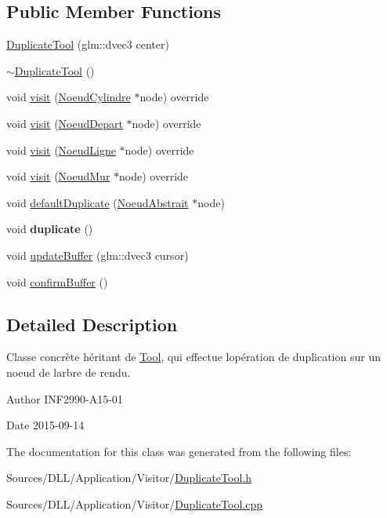 \subsection*{Public Member Functions}
\begin{DoxyCompactItemize}
\item 
\hyperlink{group__inf2990_ga13dd0524e005f4a44dbaeea9f237d761}{Duplicate\+Tool} (glm\+::dvec3 center)
\item 
\hyperlink{group__inf2990_gaab141bc62b424e5e0bfc48bd899bcb8a}{$\sim$\+Duplicate\+Tool} ()
\item 
void \hyperlink{group__inf2990_gab91de27487440694048c1a0fbcc74da7}{visit} (\hyperlink{class_noeud_cylindre}{Noeud\+Cylindre} $\ast$node) override
\item 
void \hyperlink{group__inf2990_ga5fa8bbf01a90c95062c8104ebdf5bb62}{visit} (\hyperlink{class_noeud_depart}{Noeud\+Depart} $\ast$node) override
\item 
void \hyperlink{group__inf2990_ga73745cfc31434fbac0697d54aad3f571}{visit} (\hyperlink{class_noeud_ligne}{Noeud\+Ligne} $\ast$node) override
\item 
void \hyperlink{group__inf2990_ga9b9e4456490e59603f3d8924fdf19c18}{visit} (\hyperlink{class_noeud_mur}{Noeud\+Mur} $\ast$node) override
\item 
void \hyperlink{group__inf2990_ga4708caab32b10170d24dba25d4829677}{default\+Duplicate} (\hyperlink{class_noeud_abstrait}{Noeud\+Abstrait} $\ast$node)
\item 
\hypertarget{group__inf2990_gadbe76417e934ddabc6df18141162fe2c}{}void {\bfseries duplicate} ()\label{group__inf2990_gadbe76417e934ddabc6df18141162fe2c}

\item 
void \hyperlink{group__inf2990_ga2fad36673e41afac22177ca37c6c75ff}{update\+Buffer} (glm\+::dvec3 cursor)
\item 
void \hyperlink{group__inf2990_ga69fcbb20577c85049ca9a5ca8b37091d}{confirm\+Buffer} ()
\end{DoxyCompactItemize}


\subsection{Detailed Description}
Classe concrète héritant de \hyperlink{class_tool}{Tool}, qui effectue l\textquotesingle{}opération de duplication sur un noeud de l\textquotesingle{}arbre de rendu. 

\begin{DoxyAuthor}{Author}
I\+N\+F2990-\/\+A15-\/01 
\end{DoxyAuthor}
\begin{DoxyDate}{Date}
2015-\/09-\/14 
\end{DoxyDate}


The documentation for this class was generated from the following files\+:\begin{DoxyCompactItemize}
\item 
Sources/\+D\+L\+L/\+Application/\+Visitor/\hyperlink{_duplicate_tool_8h}{Duplicate\+Tool.\+h}\item 
Sources/\+D\+L\+L/\+Application/\+Visitor/\hyperlink{_duplicate_tool_8cpp}{Duplicate\+Tool.\+cpp}\end{DoxyCompactItemize}
